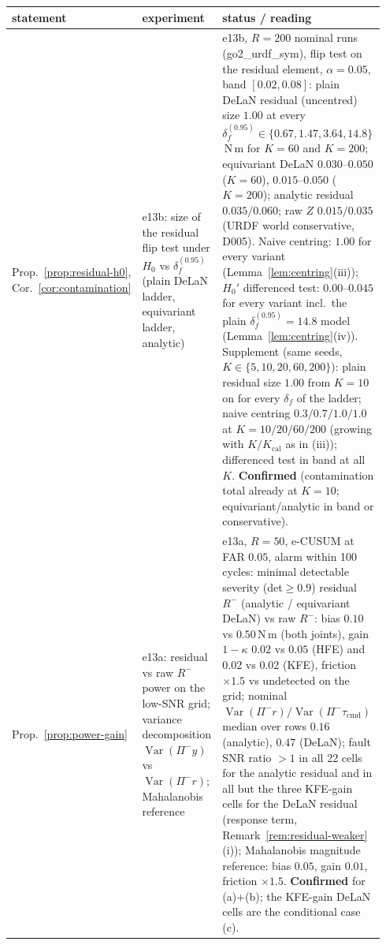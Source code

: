 \begin{table}[p]
\centering
\footnotesize
\begin{tabular}{@{}>{\raggedright\arraybackslash}p{0.15\linewidth}>{\raggedright\arraybackslash}p{0.24\linewidth}p{0.55\linewidth}@{}}
\toprule
statement & experiment & status / reading \\
\midrule
Prop.~\ref{prop:residual-h0}, Cor.~\ref{cor:contamination} &
e13b: size of the residual flip test under $H_0$ vs $\delta_f^{(0.95)}$
(plain DeLaN ladder, equivariant ladder, analytic) &
e13b, $R=200$ nominal runs (go2\_urdf\_sym), flip test on the residual element, $\alpha=0.05$, band $[0.02,0.08]$: plain DeLaN residual (uncentred) size $1.00$ at every $\delta_f^{(0.95)} \in \{0.67, 1.47, 3.64, 14.8\}$\,N\,m for $K=60$ and $K=200$; equivariant DeLaN $0.030$--$0.050$ ($K=60$), $0.015$--$0.050$ ($K=200$); analytic residual $0.035/0.060$; raw $Z$ $0.015/0.035$ (URDF world conservative, D005). Naive centring: $1.00$ for every variant (Lemma~\ref{lem:centring}(iii)); $H_0'$ differenced test: $0.00$--$0.045$ for every variant incl.\ the plain $\delta_f^{(0.95)}=14.8$ model (Lemma~\ref{lem:centring}(iv)). Supplement (same seeds, $K\in\{5,10,20,60,200\}$): plain residual size $1.00$ from $K=10$ on for every $\delta_f$ of the ladder; naive centring $0.3/0.7/1.0/1.0$ at $K=10/20/60/200$ (growing with $K/K_{\mathrm{cal}}$ as in (iii)); differenced test in band at all $K$. \textbf{Confirmed} (contamination total already at $K=10$; equivariant/analytic in band or conservative). \\
Prop.~\ref{prop:power-gain} &
e13a: residual vs raw $R^{-}$ power on the low-SNR grid; variance
decomposition $\operatorname{Var}(\Pi^-y)$ vs $\operatorname{Var}(\Pi^-r)$;
Mahalanobis reference &
e13a, $R=50$, e-CUSUM at FAR $0.05$, alarm within 100 cycles: minimal detectable severity (det$\ge 0.9$) residual $R^-$ (analytic / equivariant DeLaN) vs raw $R^-$: bias $0.10$ vs $0.50$\,N\,m (both joints), gain $1-\kappa$ $0.02$ vs $0.05$ (HFE) and $0.02$ vs $0.02$ (KFE), friction $\times 1.5$ vs undetected on the grid; nominal $\operatorname{Var}(\Pi^-r)/\operatorname{Var}(\Pi^-\tau_{\mathrm{cmd}})$ median over rows $0.16$ (analytic), $0.47$ (DeLaN); fault SNR ratio $>1$ in all 22 cells for the analytic residual and in all but the three KFE-gain cells for the DeLaN residual (response term, Remark~\ref{rem:residual-weaker}(i)); Mahalanobis magnitude reference: bias $0.05$, gain $0.01$, friction $\times 1.5$. \textbf{Confirmed} for (a)+(b); the KFE-gain DeLaN cells are the conditional case (c). \\

\end{tabular}
\end{table}

